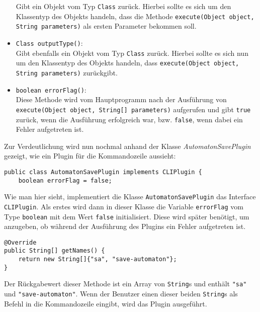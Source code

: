 \begin{itemize}
	Gibt ein Objekt vom Typ \lstinline[columns=fixed]{Class} zurück. Hierbei sollte es sich um den Klassentyp des Objekts handeln, dass die Methode \lstinline[columns=fixed]{execute(Object object, String parameters)} als ersten Parameter bekommen soll.
	\item \lstinline[columns=fixed]{Class outputType()}:\\
	Gibt ebenfalls ein Objekt vom Typ \lstinline[columns=fixed]{Class} zurück. Hierbei sollte es sich nun um den Klassentyp des Objekts handeln, dass \lstinline[columns=fixed]{execute(Object object, String parameters)} zurückgibt.
	\item \lstinline[columns=fixed]{boolean errorFlag()}:\\
	Diese Methode wird vom Hauptprogramm nach der Ausführung von \lstinline[columns=fixed]{execute(Object object, String[] parameters)} aufgerufen und gibt \lstinline[columns=fixed]{true} zurück, wenn die Ausführung erfolgreich war, bzw. \lstinline[columns=fixed]{false}, wenn dabei ein Fehler aufgetreten ist.
\end{itemize}
Zur Verdeutlichung wird nun nochmal anhand der Klasse \textit{AutomatonSavePlugin} gezeigt, wie ein Plugin für die Kommandozeile aussieht:
\begin{lstlisting}[frame=single, basicstyle=\small, caption=Der Kopf der Klasse \textit{AutomatonSavePlugin}]
public class AutomatonSavePlugin implements CLIPlugin {
	boolean errorFlag = false;
\end{lstlisting}
Wie man hier sieht, implementiert die Klasse \lstinline[columns=fixed]{AutomatonSavePlugin} das Interface \lstinline[columns=fixed]{CLIPlugin}. Als erstes wird dann in dieser Klasse die Variable \lstinline[columns=fixed]{errorFlag} vom Type \lstinline[columns=fixed]{boolean} mit dem Wert \lstinline[columns=fixed]{false} initialisiert. Diese wird später benötigt, um anzugeben, ob während der Ausführung des Plugins ein Fehler aufgetreten ist.
\begin{lstlisting}[frame=single, basicstyle=\small, caption=Die Methode \textit{getNames}]
@Override
public String[] getNames() {
	return new String[]{"sa", "save-automaton"};
}
\end{lstlisting}
Der Rückgabewert dieser Methode ist ein Array von \lstinline[columns=fixed]{String}s und enthält \lstinline[columns=fixed]{"sa"} und \lstinline[columns=fixed]{"save-automaton"}. Wenn der Benutzer einen dieser beiden \lstinline[columns=fixed]{String}s als Befehl in die Kommandozeile eingibt, wird das Plugin ausgeführt.
